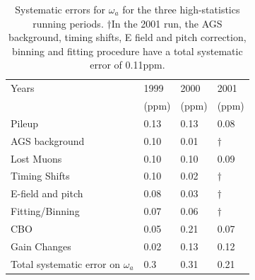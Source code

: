 \documentclass{outhesis}
\begin{document}
\begin{table}
  \caption{ Systematic errors for $\omega_a$ for the three high-statistics running periods. ${\dagger}$In the 2001 run, the AGS background, timing shifts, E field and pitch correction, binning and fitting procedure have a total systematic error of 0.11ppm. }
  \label{tab:sys}
  \centering
  \begin{tabular}{*{4}{l}}
	\hline \hline
      Years   & 1999 & 2000  & 2001 \\ 
       & (ppm) & (ppm) & (ppm)\\
      \hline
       Pileup & 0.13 & 0.13 & 0.08  \\
       AGS background & 0.10 & 0.01 &    ${\dagger}$\\
       Lost Muons & 0.10 & 0.10 & 0.09  \\
       Timing Shifts & 0.10 & 0.02 &    ${\dagger}$\\
       E-field and pitch & 0.08 & 0.03 &    ${\dagger}$\\
       Fitting/Binning & 0.07 & 0.06 &    ${\dagger}$\\
       CBO  & 0.05 & 0.21 & 0.07  \\
       Gain Changes & 0.02 & 0.13 & 0.12   \\ \hline
       Total systematic error on $\omega_a$ & 0.3 & 0.31 & 0.21  \\
         \hline  \hline
     \end{tabular}
\end{table}
\end{document}
